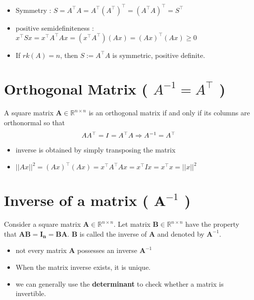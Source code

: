 \begin{itemize}
    \item Symmetry : $S = A^\top A = A^\top (A^\top )^\top  = (A^\top A)^\top  = S^\top$ 

    \item positive semidefiniteness : $x^\top Sx = x^\top A^\top Ax = (x^\top A^\top )(Ax) = (Ax)^\top (Ax) \geq 0$ 

    \item If $rk(A) = n$, then $S := A^\top A$ is symmetric, positive definite.
\end{itemize}



\section{Orthogonal Matrix ( $A^{-1} = A^\top$ ) \cite{mfml-1}}\label{Orthogonal Matrix}
A square matrix $\mathbf{A} \in \mathbb{R}^{n\times n}$ is an orthogonal matrix if and only if its columns are orthonormal so that 
\[
    \hfill
    AA^\top  = I = A^\top A 	
    \Rightarrow	 A^{-1} = A^\top 
    \hfill
\]

\begin{itemize}
    \item inverse is obtained by simply transposing the matrix

    \item $||Ax||^2 = (Ax)^\top (Ax) = x^\top A^\top Ax = x^\top Ix = x^\top x = ||x||^2$
\end{itemize}


\section{Inverse of a matrix ( $\mathbf{A}^{-1}$ ) \cite{mfml-1}}\label{Inverse of a matrix}

Consider a square matrix $\mathbf{A} \in \mathbb{R}^{n\times n}$. Let matrix $\mathbf{B} \in \mathbb{R}^{n\times n}$ have the property that $\mathbf{AB = I_n = BA}$. $\mathbf{B}$ is called the inverse of $\mathbf{A}$ and denoted by $\mathbf{A}^{-1}$.

\begin{itemize}
    \item not every matrix $\mathbf{A}$ possesses an inverse $\mathbf{A}^{-1}$

    \item When the matrix inverse exists, it is unique.
    
    \item we can generally use the \textbf{determinant} to check whether a matrix is invertible.
\end{itemize}

